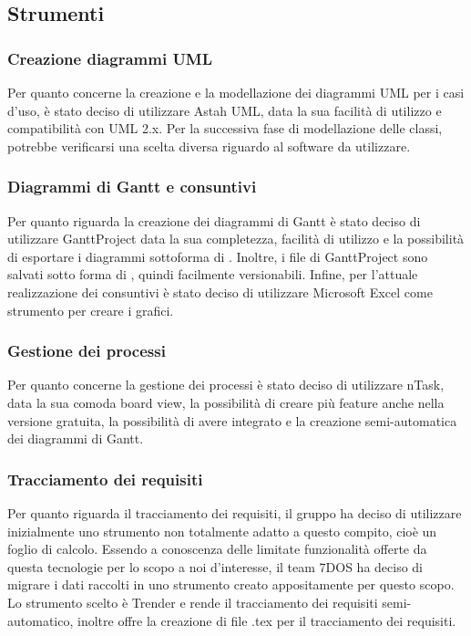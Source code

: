 \subsection{Strumenti}
\subsubsection{Creazione diagrammi UML}
Per quanto concerne la creazione e la modellazione dei diagrammi UML per i casi d'uso, è stato deciso di utilizzare Astah UML, data la sua facilità di utilizzo e compatibilità con UML 2.x. Per la successiva fase di modellazione delle classi, potrebbe verificarsi una scelta diversa riguardo al software da utilizzare.
\subsubsection{Diagrammi di Gantt e consuntivi}
Per quanto riguarda la creazione dei diagrammi di Gantt è stato deciso di utilizzare GanttProject data la sua completezza, facilità di utilizzo e la possibilità di esportare i diagrammi sottoforma di . Inoltre, i file di GanttProject sono salvati sotto forma di , quindi facilmente versionabili.
Infine, per l'attuale realizzazione dei consuntivi è stato deciso di utilizzare Microsoft Excel come strumento per creare i grafici.
\subsubsection{Gestione dei processi}
Per quanto concerne la gestione dei processi è stato deciso di utilizzare nTask, data la sua comoda board view, la possibilità di creare più feature anche nella versione gratuita, la possibilità di avere  integrato e la creazione semi-automatica dei diagrammi di Gantt.
\subsubsection{Tracciamento dei requisiti}
Per quanto riguarda il tracciamento dei requisiti, il gruppo ha deciso di utilizzare inizialmente uno strumento non totalmente adatto a questo compito, cioè un foglio di calcolo. Essendo a conoscenza delle limitate funzionalità offerte da questa tecnologie per lo scopo a noi d'interesse, il team 7DOS ha deciso di migrare i dati raccolti in uno strumento creato appositamente per questo scopo. Lo strumento scelto è Trender e rende il tracciamento dei requisiti semi-automatico, inoltre offre la creazione di file .tex per il tracciamento dei requisiti.
\pagebreak

